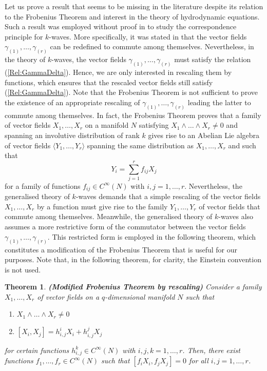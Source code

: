 \documentclass{birkjour}
\newtheorem{thm}{Theorem}[section]
\theoremstyle{definition}
\theoremstyle{remark}
\numberwithin{equation}{section}
\numberwithin{equation}{section}
\numberwithin{thm}{section}
\numberwithin{equation}{section}
\numberwithin{thm}{section}
\begin{document}
Let us prove a result that seems to be missing in the literature despite its relation to the Frobenius Theorem and interest in the theory of hydrodynamic equations. Such a result was employed without proof in \cite{GL91} to study  the correspondence principle for $k$-waves. More specifically, it was stated in \cite{GL91} that the vector fields $\gamma_{(1)},\ldots,\gamma_{(r)}$ can be redefined to commute among themselves. Nevertheless, in the theory of  $k$-waves, the vector fields $\gamma_{(1)},\ldots,\gamma_{(r)}$ must satisfy the relation  (\ref{Rel:GammaDelta}). Hence, we are only interested in rescaling them by functions, which ensures that the rescaled vector fields still satisfy (\ref{Rel:GammaDelta}). Note that the Frobenius Theorem is not sufficient to prove the existence of an appropriate rescaling of  $\gamma_{(1)},\ldots,\gamma_{(r)}$ leading the latter to commute  among themselves. In fact,
the Frobenius Theorem proves that a family of vector fields $X_1,\ldots,X_r$ on a manifold $N$ satisfying $X_1\wedge\ldots\wedge X_r\neq 0$ and  spanning an involutive distribution of rank $k$ gives rise to an Abelian Lie algebra of vector fields  $\langle Y_1,\ldots,Y_r \rangle $ spanning the same distribution as $X_1,\ldots,X_r$ and such that
$$
Y_i=\sum_{j=1}^rf_{ij}X_j
$$
for a family of functions $f_{ij}\in C^\infty(N)$ with $i,j=1,\ldots,r$. Nevertheless, the generalised theory of $k$-waves demands that a simple rescaling of the vector fields $X_1,\ldots, X_r$ by a function must give rise to the family $Y_1,\ldots,Y_r$ of vector fields that commute among themselves. Meanwhile, the generalised theory of  $k$-waves also assumes a more restrictive form of the commutator between the vector fields  $\gamma_{(1)},\ldots,\gamma_{(r)}$. This restricted form is employed in the following theorem, which constitutes a modification of the Frobenius Theorem that is useful for our purposes. Note that, in the following theorem, for clarity, the Einstein convention is not used.

\begin{thm} {\bf (Modified Frobenius Theorem by rescaling)} Consider a family $X_1,\ldots,X_r$ of  vector fields on a $q$-dimensional manifold $N$ such that
	\begin{enumerate}
		\item  $X_1\wedge\ldots\wedge X_r\neq0$
		\item  $[X_i,X_j]=h_{i,j}^iX_i+h_{i,j}^jX_j$ 
	\end{enumerate} 
	for certain functions $h_{i,j}^k\in C^\infty(N)$ with $i,j,k=1,\ldots,r$. Then, there exist functions $f_1,\ldots,f_r\in C^\infty(N)$ such that $[f_iX_i,f_jX_j]=0$ for all $i,j=1,\ldots,r$. 
	
\end{thm}
\end{document}
